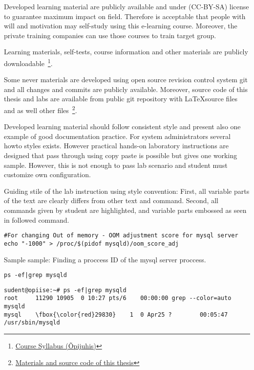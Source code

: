 Developed learning material are publicly available and under (\gls{CC-BY-SA}) license to guarantee maximum impact on field. Therefore is acceptable that people with will and motivation may self-study using this e-learning course. Moreover, the private training companies can use those courses to train target group.

Learning materials, self-tests, course information and other materials are publicly downloadable~\footnote{\href{http://elab.itcollege.ee:8000/cyber-course/}{Course Syllabus (Õpijuhis)}}.


Some never materials are developed using open source revision control system \gls{git} and all changes and commits are publicly available. Moreover, source code of this thesis and labs are available from public \gls{git} repository with \LaTeX  source files and as well other files~\footnote{\href{https://github.com/magavdraakon/margus-thesis.git}{Materials and source code of this thesis}}.


Developed learning material should follow consistent style and present also one example of good documentation practice. For system administrators several howto styles exists. However practical hands-on laboratory instructions are designed that pass through using copy paste is possible but gives one working sample. However, this is not enough to pass lab scenario and student must customize own configuration.

Guiding stile of the lab instruction using style convention: First, all variable parts of the text are clearly differs from other text and command. Second, all commands given by student are highlighted, and variable parts embossed as seen in followed command.


\begin{verbatim}
#For changing Out of memory - OOM adjustment score for mysql server
echo "-1000" > /proc/$(pidof mysqld)/oom_score_adj
\end{verbatim}



Sample sample: Finding a proccess ID of the mysql server proccess.

\begin{verbatim}
ps -ef|grep mysqld
\end{verbatim}
\label{code_sample}
%
\small{
\begin{Verbatim}[samepage=true,frame=single,
label=Command output,framesep=2mm,rulecolor=\color{red},commandchars=\\\{\}]
sudent@opiise:~# ps -ef|grep mysqld
root     11290 10905  0 10:27 pts/6    00:00:00 grep --color=auto mysqld
mysql    \fbox{\color{red}29830}    1  0 Apr25 ?        00:05:47 /usr/sbin/mysqld
\end{Verbatim}
%
}

